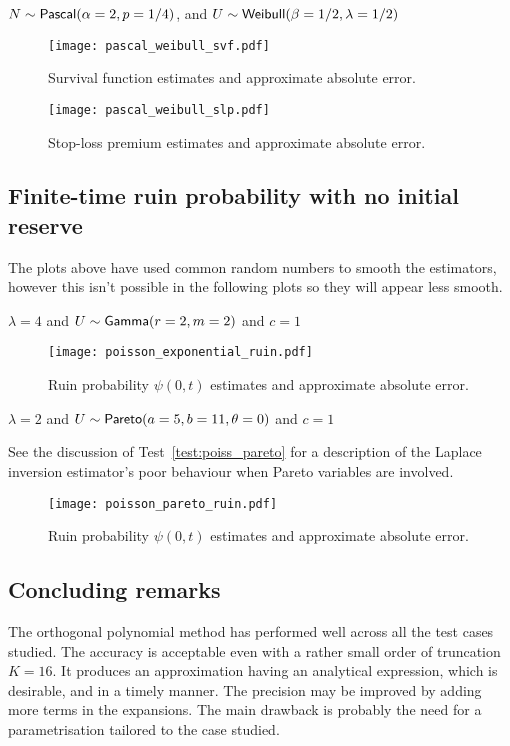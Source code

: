 \begin{test} $N \sim \mathsf{Pascal}(\alpha=2,p=1/4)$, and $U \sim \mathsf{Weibull}(\beta=1/2,\lambda=1/2)$
\end{test}

\begin{figure}[H]
\centering
\texttt{[image: pascal\_weibull\_svf.pdf]}
\caption{Survival function estimates and approximate absolute error.}
\end{figure}

\begin{figure}[H]
\centering
\texttt{[image: pascal\_weibull\_slp.pdf]}
\caption{Stop-loss premium estimates and approximate absolute error.}
\end{figure}


\subsection{Finite-time ruin probability with no initial reserve} \label{subsec:ApproximationFiniteTimeRuinProbability}

The plots above have used common random numbers to smooth the estimators, however this isn't possible in the following plots so they will appear less smooth.

\begin{test}
$\lambda=4$ and $U\sim\mathsf{Gamma}(r=2,m=2)$ and $c=1$
\end{test}


\begin{figure}[H]
\centering
\texttt{[image: poisson\_exponential\_ruin.pdf]}
\caption{Ruin probability $\psi(0, t)$ estimates and approximate absolute error.}
\end{figure}


\begin{test} $\lambda=2$ and $U \sim \mathsf{Pareto}(a=5,b=11,\theta=0)$ and $c=1$
\end{test}

See the discussion of Test~\ref{test:poiss_pareto} for a description of the Laplace inversion estimator's poor behaviour when Pareto variables are involved.

\begin{figure}[H]
\centering
\texttt{[image: poisson\_pareto\_ruin.pdf]}
\caption{Ruin probability $\psi(0, t)$ estimates and approximate absolute error.}
\end{figure}
\subsection{Concluding remarks}
The orthogonal polynomial method has performed well across all the test cases studied. The accuracy is acceptable even with a rather small order of truncation $K=16$. It produces an approximation having an analytical expression, which is desirable, and in a timely manner. The precision may be improved by adding more terms in the expansions. The main drawback is probably the need for a parametrisation tailored to the case studied.

